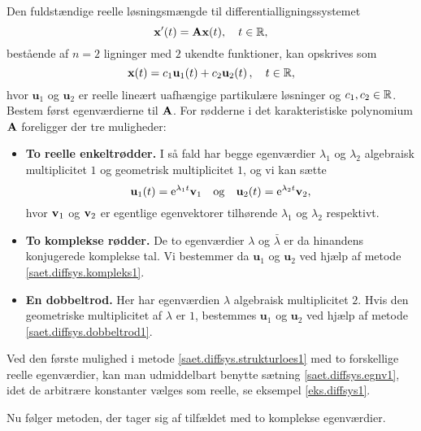 \begin{method} \label{saet.diffsys.strukturloes1}
Den fuldstændige reelle løsningsmængde til differentialligningssystemet
\begin{equation}
\mathbf{x}'(t) = \mathbf{A} \mathbf{x}(t), \quad t \in \mathbb{R},
\end{equation}
bestående af $ n = 2 $ ligninger med $2$ ukendte funktioner, kan opskrives som 
\begin{equation}
\mathbf{x}(t) = c_1 \mathbf u_1(t) + c_2 \mathbf u_2(t)\,, \quad t \in \mathbb{R},
\end{equation}
hvor $\mathbf u_1 $ og $\mathbf u_2 $ er reelle lineært uafhængige partikulære løsninger og $ c_1,c_2 \in \mathbb{R} $.\bs
Bestem først egenværdierne til $ \mathbf{A} $. For rødderne i det karakteristiske polynomium $ \mathbf{A} $ foreligger der tre muligheder:
\begin{itemize}
\item \textbf{To reelle enkeltrødder.} I så fald har begge egenværdier $ \lambda_1 $ og $ \lambda_2 $ algebraisk multiplicitet $1$ og geometrisk multiplicitet $1$, og vi kan sætte
\begin{equation}
\mathbf u_1(t) = \mathrm{e}^{\lambda_1 t} \mathbf{v}_1 \quad \mathrm{og} \quad \mathbf u_2(t) = \mathrm{e}^{\lambda_2 t} \mathbf{v}_2,
\end{equation}
hvor $ \mathbf{v}_1 $ og $ \mathbf{v}_2 $ er egentlige egenvektorer tilhørende $ \lambda_1 $ og $ \lambda_2 $ respektivt.
\item \textbf{To komplekse rødder.} De to egenværdier $ \lambda $ og $ \bar{\lambda} $ er da hinandens konjugerede komplekse tal. Vi bestemmer da $ \mathbf u_1 $ og $ \mathbf u_2 $ ved hjælp af metode \ref{saet.diffsys.kompleks1}.
\item \textbf{En dobbeltrod.} Her har egenværdien $ \lambda $ algebraisk multiplicitet $2$. Hvis den geometriske multiplicitet af $\lambda$ er $1$, bestemmes $ \mathbf u_1 $ og $ \mathbf u_2 $ ved hjælp af metode \ref{saet.diffsys.dobbeltrod1}.
\end{itemize}
\end{method}
 
Ved den første mulighed i metode \ref{saet.diffsys.strukturloes1} med to forskellige reelle egenværdier, kan man udmiddelbart benytte sætning \ref{saet.diffsys.egnv1}, idet de arbitrære konstanter vælges som reelle, se eksempel \ref{eks.diffsys1}. \bs

Nu følger metoden, der tager sig af tilfældet med to komplekse egenværdier.

